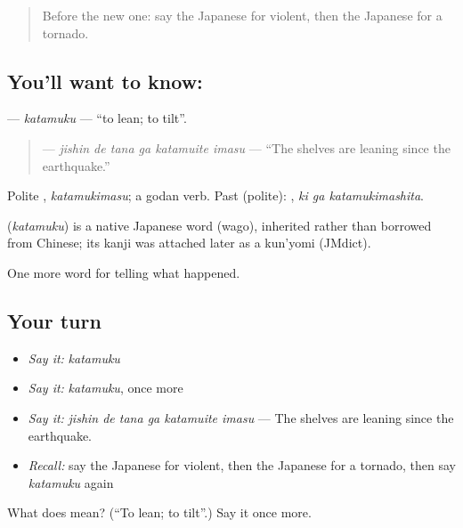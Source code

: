 \label{lesson:JA-C278-katamuku}



\begin{quote}
Before the new one: say the Japanese for violent, then the Japanese for a tornado.
\end{quote}

\subsection*{You'll want to know: }
\textbf{} — \emph{katamuku} — \textquotedblleft{}to lean; to tilt\textquotedblright{}.

\begin{quote}
\textbf{  } — \emph{jishin de tana ga katamuite imasu} — \textquotedblleft{}The shelves are leaning since the earthquake.\textquotedblright{}
\end{quote}

Polite \textbf{}, \emph{katamukimasu}; a godan verb. Past (polite): \textbf{ }, \emph{ki ga katamukimashita}.

\begin{cousinweb}
\textbf{} (\emph{katamuku}) is a native Japanese word (wago), inherited rather than borrowed from Chinese; its kanji was attached later as a kun'yomi (JMdict).
\end{cousinweb}

\begin{grammarlens}[title={What you've built}]
One more word for telling what happened.
\end{grammarlens}

\subsection*{Your turn}
\begin{itemize}
\raggedright
  \item \emph{Say it:} \emph{katamuku}
  \item \emph{Say it:} \emph{katamuku}, once more
  \item \emph{Say it:} \emph{jishin de tana ga katamuite imasu} — The shelves are leaning since the earthquake.
  \item \emph{Recall:} say the Japanese for violent, then the Japanese for a tornado, then say \emph{katamuku} again
\end{itemize}

\begin{tcolorbox}[breakable,colback=teal!4,colframe=teal!35!black,title={Before you move on}]
What does  mean? (\textquotedblleft{}To lean; to tilt\textquotedblright{}.) Say it once more.
\end{tcolorbox}
